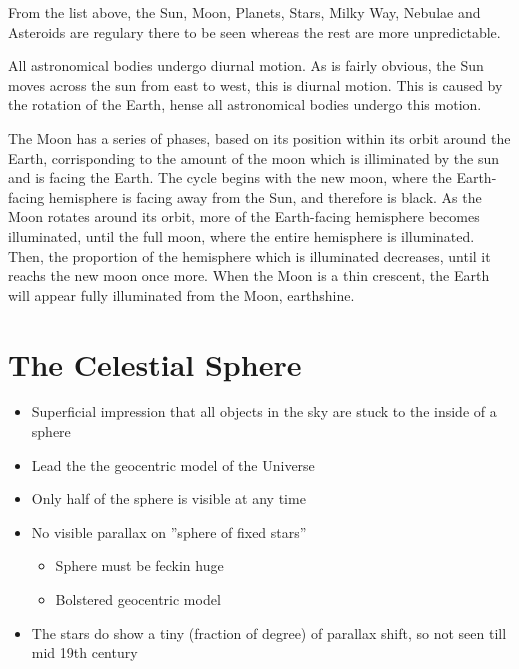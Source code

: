 \documentclass[a4paper, 11pt]{article}
\begin{document}
From the list above, the Sun, Moon, Planets, Stars, Milky Way, Nebulae and Asteroids are regulary there to be seen whereas the rest are more unpredictable.

All astronomical bodies undergo diurnal motion. As is fairly obvious, the Sun moves across the sun from east to west, this is diurnal motion. This is caused by the rotation of the Earth, hense all astronomical bodies undergo this motion.

The Moon has a series of phases, based on its position within its orbit around the Earth, corrisponding to the amount of the moon which is illiminated by the sun and is facing the Earth. The cycle begins with the new moon, where the Earth-facing hemisphere is facing away from the Sun, and therefore is black. As the Moon rotates around its orbit, more of the Earth-facing hemisphere becomes illuminated, until the full moon, where the entire hemisphere is illuminated. Then, the proportion of the hemisphere which is illuminated decreases, until it reachs the new moon once more. When the Moon is a thin crescent, the Earth will appear fully illuminated from the Moon, earthshine.

\section{The Celestial Sphere}

\begin{itemize}
\item Superficial impression that all objects in the sky are stuck to the inside of a sphere
\item Lead the the geocentric model of the Universe
\item Only half of the sphere is visible at any time
\item No visible parallax on ''sphere of fixed stars''
	\begin{itemize}
	\item Sphere must be feckin huge
	\item Bolstered geocentric model
	\end{itemize}
\item The stars do show a tiny (fraction of degree) of parallax shift, so not seen till mid 19th century
\end{itemize}
\end{document}
